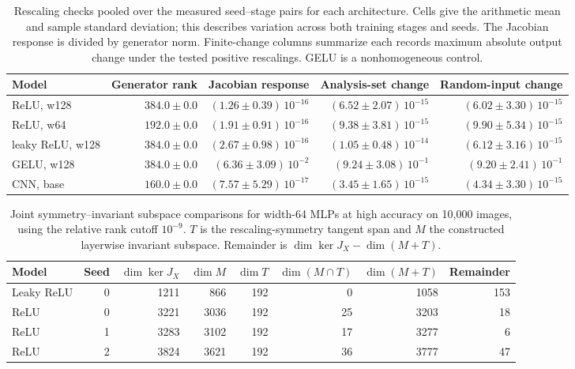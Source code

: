 \begin{table}[!htbp]\centering
\caption{Rescaling checks pooled over the measured seed--stage pairs for each architecture. Cells give the arithmetic mean and sample standard deviation; this describes variation across both training stages and seeds. The Jacobian response is divided by generator norm. Finite-change columns summarize each record\textquotesingle s maximum absolute output change under the tested positive rescalings. GELU is a nonhomogeneous control.}\label{tab:c-symmetry-summary}
\footnotesize\setlength{\tabcolsep}{4pt}\begin{tabular}{lrrrr}\toprule
Model & Generator rank & Jacobian response & Analysis-set change & Random-input change\\\midrule
ReLU, w128 & $384.0 \pm 0.0$ & $(1.26 \pm 0.39)\,10^{-16}$ & $(6.52 \pm 2.07)\,10^{-15}$ & $(6.02 \pm 3.30)\,10^{-15}$\\
ReLU, w64 & $192.0 \pm 0.0$ & $(1.91 \pm 0.91)\,10^{-16}$ & $(9.38 \pm 3.81)\,10^{-15}$ & $(9.90 \pm 5.34)\,10^{-15}$\\
leaky ReLU, w128 & $384.0 \pm 0.0$ & $(2.67 \pm 0.98)\,10^{-16}$ & $(1.05 \pm 0.48)\,10^{-14}$ & $(6.12 \pm 3.16)\,10^{-15}$\\
GELU, w128 & $384.0 \pm 0.0$ & $(6.36 \pm 3.09)\,10^{-2}$ & $(9.24 \pm 3.08)\,10^{-1}$ & $(9.20 \pm 2.41)\,10^{-1}$\\
CNN, base & $160.0 \pm 0.0$ & $(7.57 \pm 5.29)\,10^{-17}$ & $(3.45 \pm 1.65)\,10^{-15}$ & $(4.34 \pm 3.30)\,10^{-15}$\\
\bottomrule\end{tabular}\end{table}
\begin{table}[!htbp]\centering
\caption{Joint symmetry--invariant subspace comparisons for width-64 MLPs at high accuracy on 10,000 images, using the relative rank cutoff $10^{-9}$. $T$ is the rescaling-symmetry tangent span and $M$ the constructed layerwise invariant subspace. Remainder is $\dim\ker J_X-\dim(M+T)$.}\label{tab:c-symmetry-intersection}
\small\setlength{\tabcolsep}{4pt}\begin{tabular}{lrrrrrrr}\toprule
Model & Seed & $\dim\ker J_X$ & $\dim M$ & $\dim T$ & $\dim(M\cap T)$ & $\dim(M+T)$ & Remainder\\\midrule
Leaky ReLU & 0 & 1211 & 866 & 192 & 0 & 1058 & 153\\
ReLU & 0 & 3221 & 3036 & 192 & 25 & 3203 & 18\\
ReLU & 1 & 3283 & 3102 & 192 & 17 & 3277 & 6\\
ReLU & 2 & 3824 & 3621 & 192 & 36 & 3777 & 47\\
\bottomrule\end{tabular}\end{table}
\FloatBarrier
